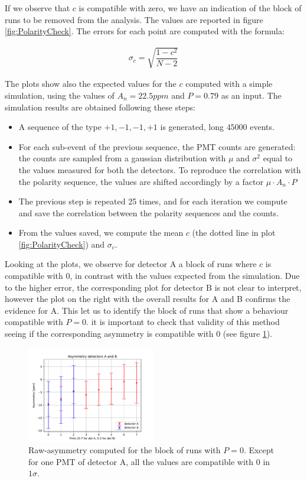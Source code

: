 If we observe that $c$ is compatible with zero, we have an indication of the block of runs to be removed from the analysis.
The values are reported in figure \ref{fig:PolarityCheck}. The errors for each point are computed with the formula:

\begin{align*}
\sigma_{c} = \sqrt{\dfrac{1 - c^{2}}{N - 2}}
\end{align*} 

The plots show also the expected values for the $c$ computed with a simple simulation, using the values of $A_{n} = 22.5 ppm$ and $P = 0.79$ as an input. The simulation results are obtained following these steps:

\begin{itemize}
\item A sequence of the type $+1,-1,-1,+1$ is generated, long $45000$ events.
\item For each sub-event of the previous sequence, the PMT counts are generated: the counts are sampled from a gaussian distribution with $\mu$ and $\sigma^{2}$ equal to the values measured for both the detectors. To reproduce the correlation with the polarity sequence, the values are shifted accordingly  by a factor $\mu \cdot A_{n} \cdot P$  
\item The previous step is repeated 25 times, and for each iteration we compute and save the correlation between the polarity sequences and the counts.
\item From the values saved, we compute the mean $c$ (the dotted line in plot \ref{fig:PolarityCheck}) and $\sigma_{c}$.
\end{itemize}

Looking at the plots, we observe for detector A a block of runs where $c$ is compatible with 0, in contrast with the values expected from the simulation. Due to the higher error, the corresponding plot for detector B is not clear to interpret, however the plot on the right with the overall results for A and B confirms the evidence for A.
This let us to identify the block of runs that show a behaviour compatible with $P = 0$. it is important to check that validity of this method seeing if the corresponding asymmetry is compatible with $0$ (see figure \ref{fig:ZeroAsym}).

\begin{figure}[hbtp]
\centering
\includegraphics[width= 0.5\textwidth]{Analysis/Dataselection/Nopolarity.pdf}
\caption{Raw-asymmetry computed for the block of runs with $P = 0$. Except for one PMT of detector A, all the values are compatible with $0$ in $1\sigma$.}
\label{fig:ZeroAsym}
\end{figure}

